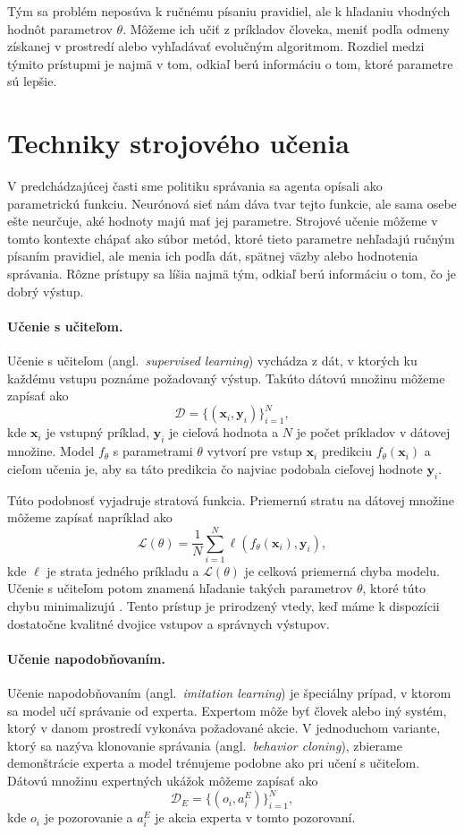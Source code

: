 Tým sa problém neposúva k ručnému písaniu pravidiel, ale k hľadaniu vhodných hodnôt parametrov $\theta$. Môžeme ich učiť z príkladov človeka, meniť podľa odmeny získanej v prostredí alebo vyhľadávať evolučným algoritmom. Rozdiel medzi týmito prístupmi je najmä v tom, odkiaľ berú informáciu o tom, ktoré parametre sú lepšie.

\section{Techniky strojového učenia}

V predchádzajúcej časti sme politiku správania sa agenta opísali ako parametrickú funkciu. Neurónová sieť nám dáva tvar tejto funkcie, ale sama osebe ešte neurčuje, aké hodnoty majú mať jej parametre. Strojové učenie môžeme v tomto kontexte chápať ako súbor metód, ktoré tieto parametre nehľadajú ručným písaním pravidiel, ale menia ich podľa dát, spätnej väzby alebo hodnotenia správania. Rôzne prístupy sa líšia najmä tým, odkiaľ berú informáciu o tom, čo je dobrý výstup.

\paragraph{Učenie s učiteľom.}
Učenie s učiteľom (angl.~\emph{supervised learning}) vychádza z dát, v ktorých ku každému vstupu poznáme požadovaný výstup. Takúto dátovú množinu môžeme zapísať ako
\[
    \mathcal{D} = \{(\mathbf{x}_i, \mathbf{y}_i)\}_{i=1}^{N},
\]
kde $\mathbf{x}_i$ je vstupný príklad, $\mathbf{y}_i$ je cieľová hodnota a $N$ je počet príkladov v dátovej množine. Model $f_\theta$ s parametrami $\theta$ vytvorí pre vstup $\mathbf{x}_i$ predikciu $f_\theta(\mathbf{x}_i)$ a cieľom učenia je, aby sa táto predikcia čo najviac podobala cieľovej hodnote $\mathbf{y}_i$.

Túto podobnosť vyjadruje stratová funkcia. Priemernú stratu na dátovej množine môžeme zapísať napríklad ako
\[
    \mathcal{L}(\theta) =
    \frac{1}{N}\sum_{i=1}^{N}
    \ell(f_\theta(\mathbf{x}_i), \mathbf{y}_i),
\]
kde $\ell$ je strata jedného príkladu a $\mathcal{L}(\theta)$ je celková priemerná chyba modelu. Učenie s učiteľom potom znamená hľadanie takých parametrov $\theta$, ktoré túto chybu minimalizujú \cite{goodfellow2016deep}. Tento prístup je prirodzený vtedy, keď máme k dispozícii dostatočne kvalitné dvojice vstupov a správnych výstupov.

\paragraph{Učenie napodobňovaním.}
Učenie napodobňovaním (angl.~\emph{imitation learning}) je špeciálny prípad, v ktorom sa model učí správanie od experta. Expertom môže byť človek alebo iný systém, ktorý v danom prostredí vykonáva požadované akcie. V jednoduchom variante, ktorý sa nazýva klonovanie správania (angl.~\emph{behavior cloning}), zbierame demonštrácie experta a model trénujeme podobne ako pri učení s učiteľom. Dátovú množinu expertných ukážok môžeme zapísať ako
\[
    \mathcal{D}_E = \{(o_i, a_i^E)\}_{i=1}^{N},
\]
kde $o_i$ je pozorovanie a $a_i^E$ je akcia experta v tomto pozorovaní.

